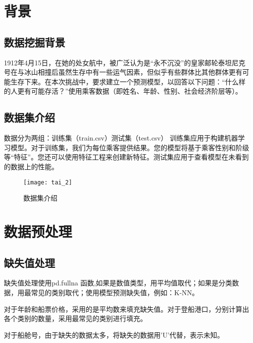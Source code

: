 \documentclass[withoutpreface,bwprint]{cumcmthesis} %
\title{}
\begin{document}
	
	
	 
	\newpage
	
	\tableofcontents
	
	\newpage
	\section{背景}
	\subsection{数据挖掘背景}
	\par 1912年4月15日，在她的处女航中，被广泛认为是“永不沉没”的皇家邮轮泰坦尼克号在与冰山相撞后虽然生存中有一些运气因素，但似乎有些群体比其他群体更有可能生存下来。在本次挑战中，要求建立一个预测模型，以回答以下问题：“什么样的人更有可能存活？”使用乘客数据（即姓名、年龄、性别、社会经济阶层等）。
	
	\subsection{数据集介绍}
	\par 数据分为两组：训练集（train.csv）测试集（test.csv）
	训练集应用于构建机器学习模型。对于训练集，我们为每位乘客提供结果。您的模型将基于乘客性别和阶级等“特征”。您还可以使用特征工程来创建新特征。测试集应用于查看模型在未看到的数据上的性能。

	
\begin{figure}[H]
	\centering
	\centerline{\texttt{[image: tai\_2]}}  
	\begin{center}
		\caption{数据集介绍}
	\end{center}
\end{figure}
	
	\section{数据预处理}
	\subsection{缺失值处理}
	\par 缺失值处理使用pd.fullna 函数,如果是数值类型，用平均值取代；如果是分类数据，用最常见的类别取代；使用模型预测缺失值，例如：K-NN。
	\par 对于年龄和船票价格，采用的是平均数来填充缺失值。对于登船港口，分别计算出各个类别的数量，采用最常见的类别进行填充。
	\par 对于船舱号，由于缺失的数据太多，将缺失的数据用’U’代替，表示未知。
	
\end{document}

